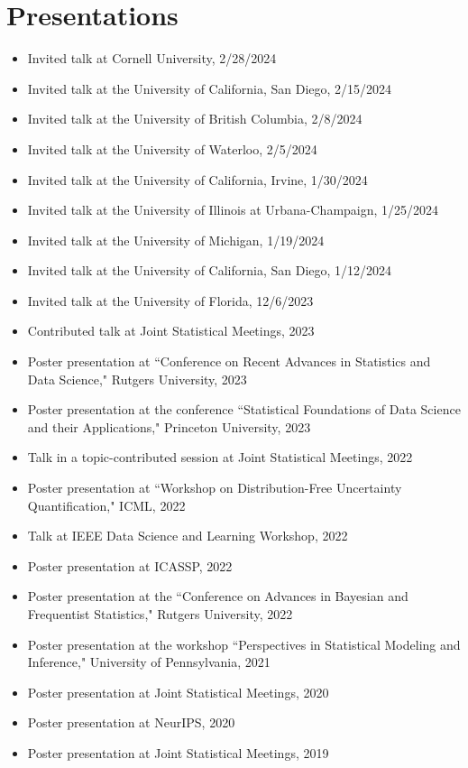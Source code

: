 \documentclass[letterpaper,11pt]{article}
\begin{document}
	\section{Presentations}
	\begin{itemize}
		\item Invited talk at Cornell University, 2/28/2024
		\item Invited talk at the University of California, San Diego, 2/15/2024
		\item Invited talk at the University of British Columbia, 2/8/2024
		\item Invited talk at the University of Waterloo, 2/5/2024
		\item Invited talk at the University of California, Irvine, 1/30/2024
		\item Invited talk at the University of Illinois at Urbana-Champaign, 1/25/2024
		\item Invited talk at the University of Michigan, 1/19/2024
		\item Invited talk at the University of California, San Diego, 1/12/2024
		\item Invited talk at the University of Florida, 12/6/2023
		\item Contributed talk at Joint Statistical Meetings, 2023
		\item Poster presentation at ``Conference on Recent Advances in Statistics and Data Science," Rutgers University, 2023
		\item Poster presentation at the conference ``Statistical Foundations of Data Science and their Applications," Princeton University, 2023
		\item Talk in a topic-contributed session at Joint Statistical Meetings, 2022
		\item Poster presentation at ``Workshop on Distribution-Free Uncertainty Quantification," ICML, 2022
		\item Talk at IEEE Data Science and Learning Workshop, 2022
		\item Poster presentation at ICASSP, 2022
		\item Poster presentation at the ``Conference on Advances in Bayesian and Frequentist Statistics," Rutgers University, 2022
		\item Poster presentation at the workshop ``Perspectives in Statistical Modeling and Inference," University of Pennsylvania, 2021
		\item Poster presentation at Joint Statistical Meetings, 2020
		\item Poster presentation at NeurIPS, 2020
		\item Poster presentation at Joint Statistical Meetings, 2019 
	\end{itemize}
\end{document}
